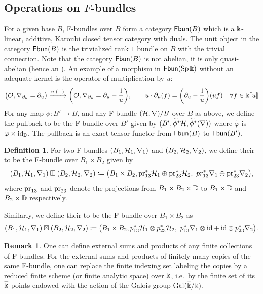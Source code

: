 \documentclass[twoside,leqno]{article}
\numberwithin{equation}{section}
\theoremstyle{plain}
\theoremstyle{definition}
\newtheorem{definition}[equation]{Definition}
\newtheorem{remark}[equation]{Remark}
\begin{document}
\subsection{Operations on \texorpdfstring{$F$}{F}-bundles}

For a given base $B$, F-bundles over $B$ form a category
$\operatorname{{\sf Fbun}}(B)$ which is a $\Bbbk$-linear, additive, Karoubi closed tensor category with duals. The unit object in the category $\operatorname{{\sf Fbun}}(B)$ is the trivialized rank $1$ bundle on $B$ with the trivial connection.
Note that the category $\operatorname{{\sf Fbun}}(B)$ is not abelian, it is only quasi-abelian (hence an ).
An example of a morphism in $\operatorname{{\sf Fbun}}(\operatorname{Sp}\Bbbk)$ without an adequate kernel is the operator of multiplication by $u$:
\[
  \big( \mathcal O, \nabla_{\partial_u}=\partial_u \big) \xrightarrow{u\cdot(-)} \bigg({\mathcal O},\nabla_{\partial_u}=\partial_u-\frac{1}{u}\bigg),\qquad
  u\cdot \partial_u(f)=\bigg(\partial_u-\frac{1}{u}\bigg)(uf)
  \quad \forall f\in {\Bbbk}[\![u]\!]
\]
For any map $\phi\colon B'\to B$, and any F-bundle $(\mathcal H, \nabla)/B$ over $B$ as above, we define the pullback to be the F-bundle over $B'$ given by $(B',\widetilde\phi^*\mathcal H,\widetilde\phi^*(\nabla))$ where $\widetilde\varphi$ is $\varphi\times{\rm id}_{\mathbb D}$.
The pullback is an exact tensor functor from $\operatorname{{\sf Fbun}}(B)$ to $\operatorname{{\sf Fbun}}(B')$.


\begin{definition}
For two F-bundles $(B_{1},\mathcal H_1,\nabla_1)$ and
$(B_{2},\mathcal H_2,\nabla_2)$, we define their  to be the F-bundle over $B_1\times B_2$ given by 
\[
(B_{1},\mathcal H_1,\nabla_1)\boxplus(B_{2},\mathcal H_2,\nabla_2) \coloneqq \big(B_{1}\times B_{2},\mathrm{pr}_{13}^*\mathcal H_1 \oplus \mathrm{pr}_{23}^*\mathcal H_2,\ pr_{13}^*\nabla_1 \oplus \mathrm{pr}_{23}^*\nabla_2\big),
\]
where $\mathrm{pr}_{13}$ and $\mathrm{pr}_{23}$ denote the projections from $B_1\times B_2\times \mathbb D$ to $B_1\times \mathbb D$ and $B_2\times \mathbb D$ respectively.

Similarly, we define their  to be the F-bundle over $B_1 \times B_2$ as
\[
(B_{1},\mathcal H_1,\nabla_1) \boxtimes (B_{2},\mathcal H_2,\nabla_2) \coloneqq \big(B_{1}\times B_{2}, p_{13}^{*} \mathcal H_1\otimes p_{23}^{*}\mathcal H_2,\ p_{13}^{*}\nabla_1\otimes \mathrm{id} +
\mathrm{id}\otimes p_{23}^{*}\nabla_2\big) .\]
\end{definition}

\begin{remark}
One can define external sums and products of any finite collections of F-bundles.
For the external sums and products of finitely many copies of the same F-bundle, one can replace the finite indexing set labeling the copies by a reduced finite scheme (or finite analytic space)  over $\Bbbk$, i.e.\ by the finite set of its
$\overline{\Bbbk}$-points endowed with the action of the Galois group $\operatorname{Gal}(\overline{\Bbbk}/\Bbbk)$.
\end{remark}
\end{document}
